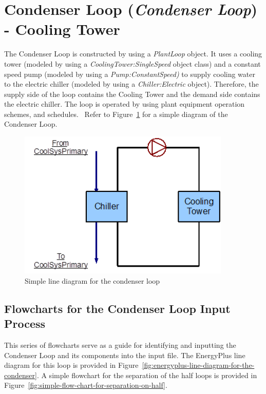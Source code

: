 \section{\texorpdfstring{Condenser Loop (\emph{Condenser Loop}) - Cooling Tower}{Condenser Loop (Condenser Loop) - Cooling Tower}}\label{condenser-loop-condenser-loop---cooling-tower}

The Condenser Loop is constructed by using a \emph{PlantLoop} object. It uses a cooling tower (modeled by using a \emph{CoolingTower:SingleSpeed} object class) and a constant speed pump (modeled by using a \emph{Pump:ConstantSpeed)} to supply cooling water to the electric chiller (modeled by using a \emph{Chiller:Electric} object). Therefore, the supply side of the loop contains the Cooling Tower and the demand side contains the electric chiller. The loop is operated by using plant equipment operation schemes, and schedules. ~Refer to Figure~\ref{fig:simple-line-diagram-for-the-condenser-loop} for a simple diagram of the Condenser Loop.

\begin{figure}[hbtp] %
\centering
\includegraphics[width=0.9\textwidth, height=0.9\textheight, keepaspectratio=true]{media/image061.png}
\caption{Simple line diagram for the condenser loop \protect \label{fig:simple-line-diagram-for-the-condenser-loop}}
\end{figure}

\subsection{Flowcharts for the Condenser Loop Input Process}\label{flowcharts-for-the-condenser-loop-input-process}

This series of flowcharts serve as a guide for identifying and inputting the Condenser Loop and its components into the input file. The EnergyPlus line diagram for this loop is provided in Figure~\ref{fig:energyplus-line-diagram-for-the-condenser}. A simple flowchart for the separation of the half loops is provided in Figure~\ref{fig:simple-flow-chart-for-separation-on-half}.

